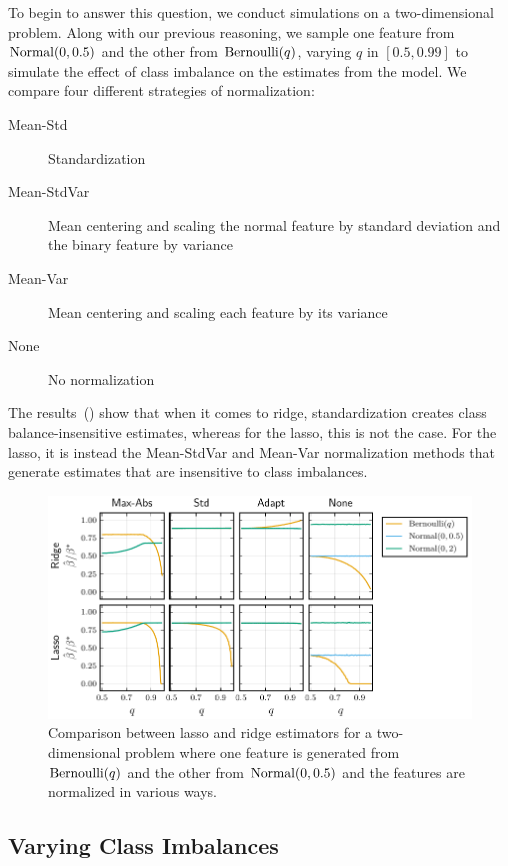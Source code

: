 To begin to answer this question, we conduct simulations on a two-dimensional problem. Along with our previous reasoning, we sample one feature from \(\operatorname{Normal}(0, 0.5)\) and the other from \(\operatorname{Bernoulli}(q)\), varying \(q\) in \([0.5, 0.99]\) to simulate the effect of class imbalance on the estimates from the model. We compare four different strategies of normalization:
\begin{description}
  \item[Mean-Std] Standardization
  \item[Mean-StdVar] Mean centering and scaling the normal feature by standard deviation and the binary feature by variance
  \item[Mean-Var] Mean centering and scaling each feature by its variance
  \item[None] No normalization
\end{description}

The results~() show that when it comes to ridge, standardization creates class balance-insensitive estimates, whereas for the lasso, this is not the case. For the lasso, it is instead the Mean-StdVar and Mean-Var normalization methods that generate estimates that are insensitive to class imbalances.

\begin{figure}[htpb]
  \centering
  \includegraphics{plots/lassoridge_twodim.pdf}
  \caption{%
    Comparison between lasso and ridge estimators for a two-dimensional problem where one feature is generated from \(\operatorname{Bernoulli}(q)\) and the other from \(\operatorname{Normal}(0, 0.5)\) and the features are normalized in various ways.}
  \label{fig:lasso-ridge-comparison}
\end{figure}

\subsection{Varying Class Imbalances}

